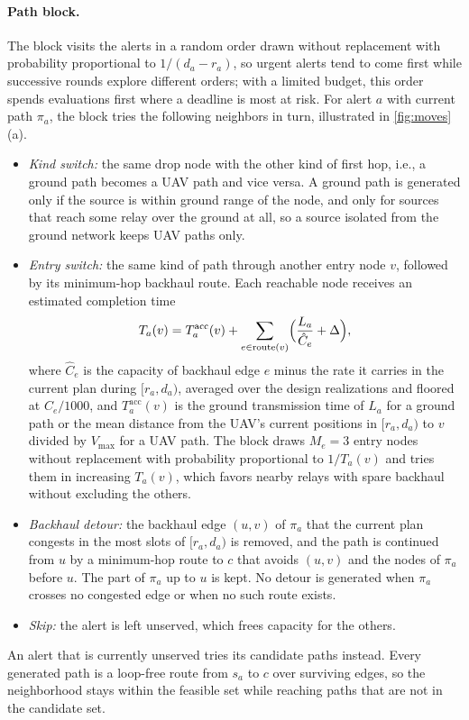 \paragraph{Path block.} The block visits the alerts in a random order drawn without replacement with probability proportional to $1/(d_a-r_a)$, so urgent alerts tend to come first while successive rounds explore different orders; with a limited budget, this order spends evaluations first where a deadline is most at risk. For alert $a$ with current path $\pi_a$, the block tries the following neighbors in turn, illustrated in \cref{fig:moves}(a).
\begin{itemize}
\item \emph{Kind switch:} the same drop node with the other kind of first hop, i.e., a ground path becomes a UAV path and vice versa. A ground path is generated only if the source is within ground range of the node, and only for sources that reach some relay over the ground at all, so a source isolated from the ground network keeps UAV paths only.
\item \emph{Entry switch:} the same kind of path through another entry node $v$, followed by its minimum-hop backhaul route. Each reachable node receives an estimated completion time
\begin{equation}
\label{eq:entry-time}
T_a(v)=T^{\mathrm{acc}}_a(v)+\sum_{e\in\mathrm{route}(v)}\Bigl(\frac{L_a}{\hat C_e}+\Delta\Bigr),
\end{equation}
\noindent where $\hat C_e$ is the capacity of backhaul edge $e$ minus the rate it carries in the current plan during $[r_a,d_a)$, averaged over the design realizations and floored at $C_e/1000$, and $T^{\mathrm{acc}}_a(v)$ is the ground transmission time of $L_a$ for a ground path or the mean distance from the UAV's current positions in $[r_a,d_a)$ to $v$ divided by $V_{\max}$ for a UAV path. The block draws $M_e=3$ entry nodes without replacement with probability proportional to $1/T_a(v)$ and tries them in increasing $T_a(v)$, which favors nearby relays with spare backhaul without excluding the others.
\item \emph{Backhaul detour:} the backhaul edge $(u,v)$ of $\pi_a$ that the current plan congests in the most slots of $[r_a,d_a)$ is removed, and the path is continued from $u$ by a minimum-hop route to $c$ that avoids $(u,v)$ and the nodes of $\pi_a$ before $u$. The part of $\pi_a$ up to $u$ is kept. No detour is generated when $\pi_a$ crosses no congested edge or when no such route exists.
\item \emph{Skip:} the alert is left unserved, which frees capacity for the others.
\end{itemize}
An alert that is currently unserved tries its candidate paths instead. Every generated path is a loop-free route from $s_a$ to $c$ over surviving edges, so the neighborhood stays within the feasible set while reaching paths that are not in the candidate set.

